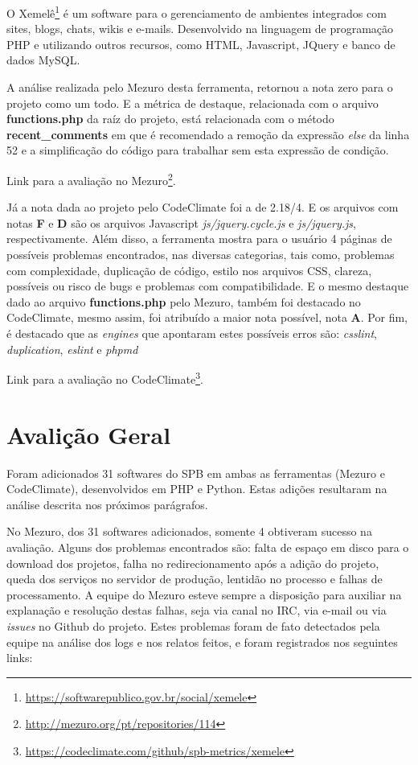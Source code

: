 O Xemelê\footnote{\url{https://softwarepublico.gov.br/social/xemele}} é um
software para o gerenciamento de ambientes integrados com sites, blogs, chats,
wikis e e-mails. Desenvolvido na linguagem de programação PHP e utilizando outros
recursos, como HTML, Javascript, JQuery e banco de dados MySQL.

A análise realizada pelo Mezuro desta ferramenta, retornou a nota zero para o
projeto como um todo. E a métrica de destaque, relacionada com o arquivo
\textbf{functions.php} da raíz do projeto, está relacionada com o método
\textbf{recent\_comments} em que é recomendado a remoção da expressão
\textit{else} da linha 52 e a simplificação do código para trabalhar sem esta
expressão de condição.

Link para a avaliação no Mezuro\footnote{\url{http://mezuro.org/pt/repositories/114}}.

Já a nota dada ao projeto pelo CodeClimate foi a de 2.18/4. E os arquivos com
notas \textbf{F} e \textbf{D} são os arquivos Javascript \textit{js/jquery.cycle.js}
e \textit{js/jquery.js}, respectivamente. Além disso, a ferramenta mostra para o
usuário 4 páginas de possíveis problemas encontrados, nas diversas categorias,
tais como, problemas com complexidade, duplicação de código, estilo nos arquivos
CSS, clareza, possíveis ou risco de bugs e problemas com compatibilidade. E o
mesmo destaque dado ao arquivo \textbf{functions.php} pelo Mezuro, também foi
destacado no CodeClimate, mesmo assim, foi atribuído a maior nota possível, nota
\textbf{A}. Por fim, é destacado que as \textit{engines} que apontaram estes possíveis
erros são: \textit{csslint}, \textit{duplication}, \textit{eslint} e
\textit{phpmd}

Link para a avaliação no CodeClimate\footnote{\url{https://codeclimate.com/github/spb-metrics/xemele}}.

\section{Avalição Geral}

Foram adicionados 31 softwares do SPB em ambas as ferramentas (Mezuro e
CodeClimate), desenvolvidos em PHP e Python. Estas adições resultaram na
análise descrita nos próximos parágrafos.

No Mezuro, dos 31 softwares adicionados, somente 4 obtiveram sucesso na
avaliação. Alguns dos problemas encontrados são: falta de espaço em disco para
o download dos projetos, falha no redirecionamento após a adição do projeto,
queda dos serviços no servidor de produção, lentidão no processo e falhas de
processamento. A equipe do Mezuro esteve sempre a disposição para auxiliar na
explanação e resolução destas falhas, seja via canal no IRC, via e-mail ou via
\textit{issues} no Github do projeto. Estes problemas foram de fato detectados
pela equipe na análise dos logs e nos relatos feitos, e foram registrados nos
seguintes links:

